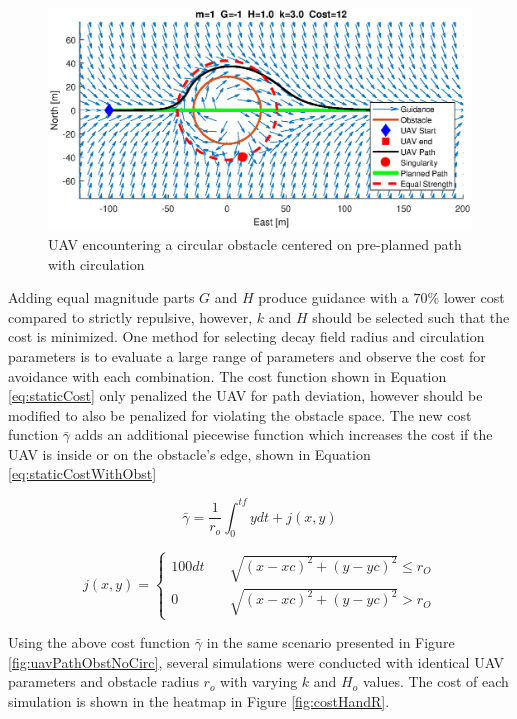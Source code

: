 \documentclass[numbered,pdftex]{ohio-etd}
\begin{document}
\begin{figure}[H]
	\centering
	\includegraphics[trim=0 85 0 85,clip,width=15cm]{PaperFigures/Methods/bruteForceSolvedN1V10WithCirc}
	\caption{UAV encountering a circular obstacle centered on pre-planned path with circulation}
	\label{fig:uavPathObstWithCirc}
\end{figure}

Adding equal magnitude parts $G$ and $H$ produce guidance with a $70 \%$ lower cost compared to strictly repulsive, however, $k$ and $H$ should be selected such that the cost is minimized. One method for selecting decay field radius and circulation parameters is to evaluate a large range of parameters and observe the cost for avoidance with each combination. The cost function shown in Equation \ref{eq:staticCost} only penalized the UAV for path deviation, however should be modified to also be penalized for violating the obstacle space. The new cost function $\bar{\gamma}$ adds an additional piecewise function which increases the cost if the UAV is inside or on the obstacle's edge, shown in Equation \ref{eq:staticCostWithObst}


 \begin{equation}
\label{eq:staticCostWithObst}
\bar{\gamma} = \frac{1}{r_o}\int_{0}^{tf}ydt + j(x,y)
\end{equation}

\begin{equation}
j(x,y) = \left\{
\begin{array}{ll}
100dt & \quad \sqrt{(x-xc)^2+(y-yc)^2} \leq r_O \\
0 & \quad \sqrt{ (x-xc)^2+(y-yc)^2 } > r_O
\end{array}
\right.
\end{equation}


Using the above cost function $\bar{\gamma}$ in the same scenario presented in Figure \ref{fig:uavPathObstNoCirc}, several simulations were conducted with identical UAV parameters and obstacle radius $r_o$ with varying $k$ and $H_o$ values. The cost of each simulation is shown in the heatmap in Figure \ref{fig:costHandR}. 
\end{document}
